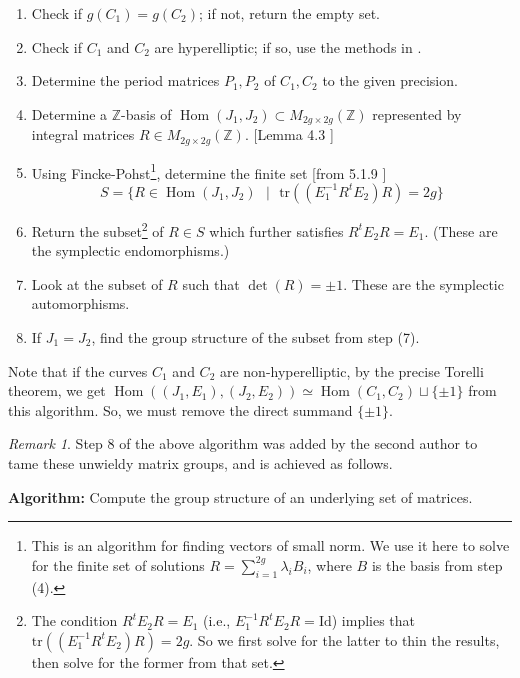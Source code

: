 \documentclass[12pt,reqno]{amsart}
\DeclareMathOperator{\Hom}{Hom}
\newcommand{\Z}{\mathbb{Z}}
\theoremstyle{definition}
\theoremstyle{remark}
\newtheorem*{remark}{Remark}
\begin{document}
\begin{enumerate}
\item Check if $g(C_1) = g(C_2)$; if not, return the empty set.
\item Check if $C_1$ and $C_2$ are hyperelliptic; if so, use the methods in \cite{hyp}.
\item Determine the period matrices $P_1, P_2$ of $C_1, C_2$ to the given precision.
\item Determine a $\Z$-basis of $\Hom(J_1, J_2) \subset M_{2g \times 2g}(\Z)$ represented by integral matrices $R \in  M_{2g \times 2g}(\Z)$. [Lemma 4.3 \cite{jeroen}]
\item Using Fincke-Pohst\footnote{This is an algorithm for finding vectors of small norm. We use it here to solve for the finite set of solutions $R = \sum_{i = 1}^{2g} \lambda_i B_i$, where $B$ is the basis from step (4).}, determine the finite set [from 5.1.9 \cite{bl}] $$S = \{ R \in \Hom(J_1, J_2) \text{ } | \text{ } \text{tr}((E_1^{-1}R^tE_2)R) = 2g\}$$
\item Return the subset\footnote{The condition $R^tE_2R = E_1$ (i.e., $E_1^{-1}R^tE_2R = \text{Id}$) implies that $\text{tr}((E_1^{-1}R^tE_2)R) = 2g$. So we first solve for the latter to thin the results, then solve for the former from that set.}  of $R \in S$ which further satisfies $R^tE_2R = E_1$. (These are the symplectic endomorphisms.)
\item Look at the subset of $R$ such that $\det(R) = \pm 1$. These are the symplectic automorphisms.
\item If $J_1 = J_2$, find the group structure of the subset from step (7).
\end{enumerate}

\vspace{+10pt} 

Note that if the curves $C_1$ and $C_2$ are non-hyperelliptic, by the precise Torelli theorem, we get $\Hom((J_1, E_1), (J_2, E_2)) \simeq \Hom(C_1, C_2) \sqcup \{ \pm 1 \}$ from this algorithm. So, we must remove the direct summand $\{ \pm 1 \}$.

\begin{remark} Step 8 of the above algorithm was added by the second author to tame these unwieldy matrix groups, and is achieved as follows.\end{remark}

\textbf{Algorithm:} Compute the group structure of an underlying set of matrices.
\end{document}
